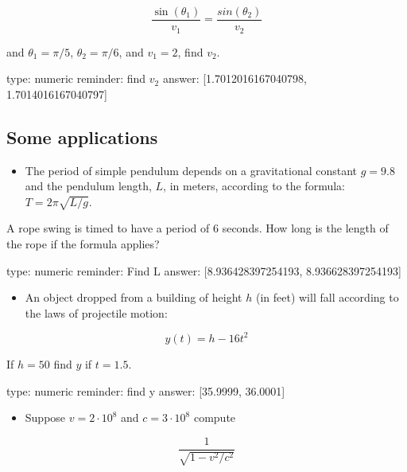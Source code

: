 \documentclass[12pt]{article}
\begin{document}
\[
\frac{\sin(\theta_1)}{v_1} = \frac{sin(\theta_2)}{v_2}
\]

and $\theta_1 = \pi/5$, $\theta_2 = \pi/6$, and $v_1=2$, find $v_2$.

\begin{answer}
    type: numeric
    reminder: find \(v_2\)
    answer: [1.7012016167040798, 1.7014016167040797]

\end{answer}

\subsection{Some applications}

\begin{itemize}
\itemsep1pt\parskip0pt
\item
  The period of simple pendulum depends on a gravitational constant
  $g=9.8$ and the pendulum length, $L$, in meters, according to the
  formula: $T=2\pi\sqrt{L/g}$.
\end{itemize}

A rope swing is timed to have a period of $6$ seconds. How long is the
length of the rope if the formula applies?

\begin{answer}
    type: numeric
    reminder: Find L
    answer: [8.936428397254193, 8.936628397254193]

\end{answer}

\begin{itemize}
\itemsep1pt\parskip0pt
\item
  An object dropped from a building of height $h$ (in feet) will fall
  according to the laws of projectile motion:
\end{itemize}

\[
y(t) = h - 16t^2
\]

If $h=50$ find $y$ if $t=1.5$.

\begin{answer}
    type: numeric
    reminder: find y
    answer: [35.9999, 36.0001]

\end{answer}

\begin{itemize}
\itemsep1pt\parskip0pt
\item
  Suppose $v = 2\cdot 10^8$ and $c = 3 \cdot 10^8$ compute
\end{itemize}

\[
\frac{1}{\sqrt{1 - v^2/c^2}}
\]
\end{document}
